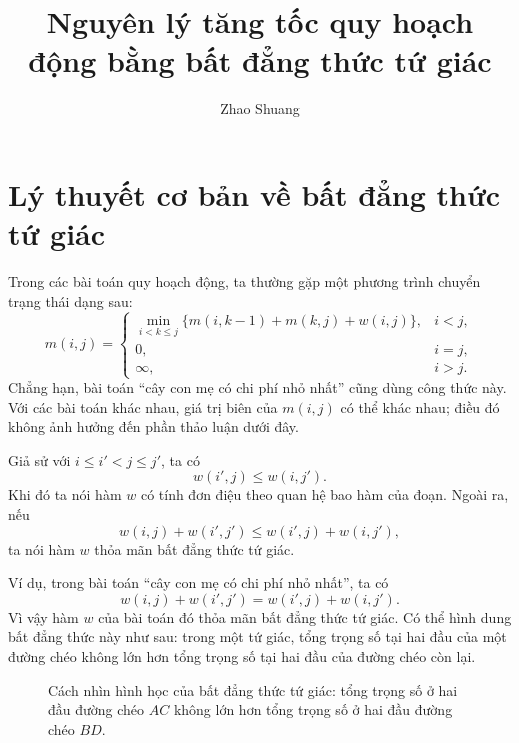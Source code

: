\documentclass[11pt]{article}
\title{Nguyên lý tăng tốc quy hoạch động bằng bất đẳng thức tứ giác}
\author{Zhao Shuang}
\date{}
\begin{document}
\maketitle


\section{Lý thuyết cơ bản về bất đẳng thức tứ giác}

Trong các bài toán quy hoạch động, ta thường gặp một phương trình chuyển
trạng thái dạng sau:
\[
  m(i,j)=
  \begin{cases}
    \displaystyle
    \min_{i<k\le j}
      \{m(i,k-1)+m(k,j)+w(i,j)\}, & i<j,\\[0.8em]
    0, & i=j,\\
    \infty, & i>j.
  \end{cases}
  \tag{1.1}
\]
Chẳng hạn, bài toán ``cây con mẹ có chi phí nhỏ nhất'' cũng dùng công thức
này. Với các bài toán khác nhau, giá trị biên của $m(i,j)$ có thể khác nhau;
điều đó không ảnh hưởng đến phần thảo luận dưới đây.

Giả sử với $i\le i'<j\le j'$, ta có
\[
  w(i',j)\le w(i,j').
\]
Khi đó ta nói hàm $w$ có tính đơn điệu theo quan hệ bao hàm của đoạn. Ngoài
ra, nếu
\[
  w(i,j)+w(i',j')\le w(i',j)+w(i,j'),
  \tag{1.2}
\]
ta nói hàm $w$ thỏa mãn bất đẳng thức tứ giác.

Ví dụ, trong bài toán ``cây con mẹ có chi phí nhỏ nhất'', ta có
\[
  w(i,j)+w(i',j')=w(i',j)+w(i,j').
\]
Vì vậy hàm $w$ của bài toán đó thỏa mãn bất đẳng thức tứ giác. Có thể hình
dung bất đẳng thức này như sau: trong một tứ giác, tổng trọng số tại hai đầu
của một đường chéo không lớn hơn tổng trọng số tại hai đầu của đường chéo còn
lại.
\begin{figure}[ht]
\centering
{}
\caption{Cách nhìn hình học của bất đẳng thức tứ giác: tổng trọng số ở hai đầu đường chéo \(AC\) không lớn hơn tổng trọng số ở hai đầu đường chéo \(BD\).}
\end{figure}
\end{document}
